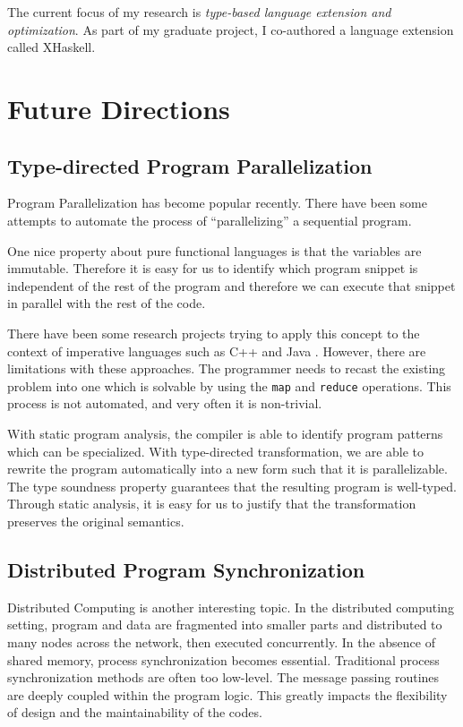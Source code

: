 \documentclass[12pt]{article}
\theoremstyle{plain} \numberwithin{equation}{section}
\theoremstyle{definition}
\begin{document}
The current focus of my research is {\em type-based language 
extension and optimization}. As part of my 
graduate project, I co-authored a language extension called XHaskell.






\section{Future Directions}

\subsection{Type-directed Program Parallelization}
Program Parallelization has become popular recently. There have been 
some attempts to automate the process of ``parallelizing'' a
sequential program.

One nice property about pure functional languages is that
the variables are immutable. Therefore it is easy for us to identify
which program snippet is independent of the rest of the program
and therefore we can execute that snippet in parallel with the rest of
the code. 

There have been some research projects trying to apply this concept
to the context of imperative languages such as C++ \cite{mapreduce} 
and Java \cite{hadoop}. However, there are limitations with these
approaches. The programmer needs to recast the existing problem into 
one which is solvable by using the {\tt map} and {\tt reduce} operations.
This process is not automated, and very often it is non-trivial.

With static program analysis, the compiler
is able to identify program patterns which can be specialized.
With type-directed transformation, we are able to rewrite the program 
automatically into a new form such that it is parallelizable. The 
type soundness property guarantees that the resulting program is
well-typed. Through static analysis, it is easy for us to justify that the
transformation preserves the original semantics.


\subsection{Distributed Program Synchronization}
Distributed Computing is another interesting topic. In the distributed
computing setting, program and data are fragmented into smaller parts and 
distributed to many nodes across the network, then executed concurrently. 
In the absence of shared
memory, process synchronization becomes essential. Traditional process
synchronization methods are often too low-level. The message passing routines
are deeply coupled within the program logic. This greatly impacts 
the flexibility of design and the maintainability of the codes.
\end{document}
